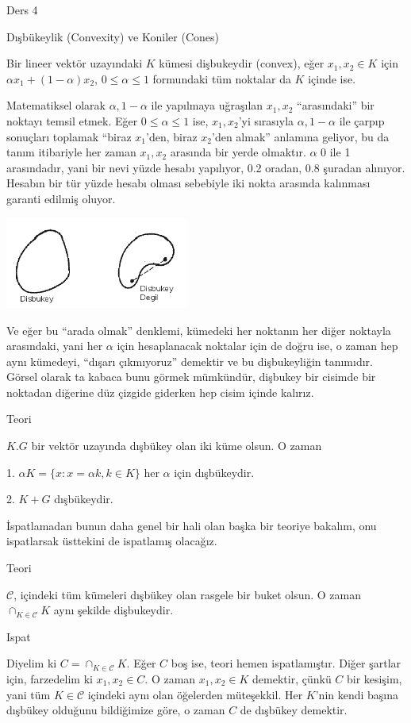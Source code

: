 \documentclass[12pt,fleqn]{article}\usepackage{../../common}
\begin{document}
Ders 4

Dışbükeylik (Convexity) ve Koniler (Cones) 

Bir lineer vektör uzayındaki $K$ kümesi dişbukeydir (convex), eğer 
$x_1,x_2 \in K$ için $\alpha x_1 + (1-\alpha)x_2$, $0 \le \alpha \le 1$ formundaki
tüm noktalar da $K$ içinde ise.

Matematiksel olarak $\alpha,1-\alpha$ ile yapılmaya uğraşılan $x_1,x_2$
``arasındaki'' bir noktayı temsil etmek. Eğer $0 \le \alpha \le 1$ ise,
$x_1,x_2$'yi sırasıyla $\alpha,1-\alpha$ ile çarpıp sonuçları toplamak
``biraz $x_1$'den, biraz $x_2$'den almak'' anlamına geliyor, bu da tanım
itibariyle her zaman $x_1,x_2$ arasında bir yerde olmaktır. $\alpha$ 0 ile
1 arasındadır, yani bir nevi yüzde hesabı yapılıyor, 0.2 oradan, 0.8
şuradan alınıyor. Hesabın bir tür yüzde hesabı olması sebebiyle iki nokta
arasında kalınması garanti edilmiş oluyor. 

\includegraphics[height=3cm]{4_1.png}

Ve eğer bu ``arada olmak'' denklemi, kümedeki her noktanın her diğer
noktayla arasındaki, yani her $\alpha$ için hesaplanacak noktalar için de
doğru ise, o zaman hep aynı kümedeyi, ``dışarı çıkmıyoruz'' demektir ve bu
dişbukeyliğin tanımıdır. Görsel olarak ta kabaca bunu görmek mümkündür,
dişbukey bir cisimde bir noktadan diğerine düz çizgide giderken hep cisim
içinde kalırız.

Teori 

$K.G$ bir vektör uzayında dışbükey olan iki küme olsun. O zaman 

1. $\alpha K = \{x: x = \alpha k, k \in K\}$ her $\alpha$ için dışbükeydir. 

2. $K+G$ dışbükeydir. 

İspatlamadan bunun daha genel bir hali olan başka bir teoriye bakalım, onu
ispatlarsak üsttekini de ispatlamış olacağız. 

Teori 

$\mathscr{C}$, içindeki tüm kümeleri dışbükey olan rasgele bir buket
olsun. O zaman $\cap_{K \in \mathscr{C}}K$ aynı şekilde dişbukeydir. 

Ispat

Diyelim ki $C = \cap_{K \in \mathscr{C}}K$. Eğer $C$ boş ise, teori hemen
ispatlamıştır. Diğer şartlar için, farzedelim ki $x_1,x_2 \in C$. O zaman
$x_1,x_2 \in K$ demektir, çünkü $C$ bir kesişim, yani tüm $K \in \mathscr{C}$
içindeki aynı olan öğelerden müteşekkil. Her $K$'nin kendi başına dışbükey
olduğunu bildiğimize göre, o zaman $C$ de dışbükey demektir. 
\end{document}
